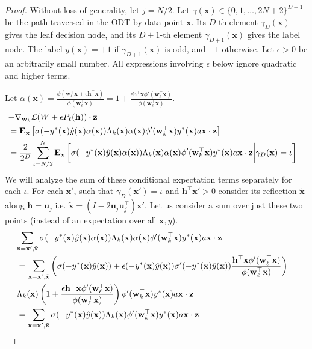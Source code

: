 \documentclass{article}
\theoremstyle{plain}
\theoremstyle{definition}
\theoremstyle{remark}
\newcommand{\E}{{\mathbf E}}
\newcommand{\1}{{\mathbf 1}}
\newcommand{\0}{{\mathbf 0}}
\newcommand{\h}{{\mathbf h}}
\newcommand{\z}{{\mathbf z}}
\newcommand{\w}{{\mathbf w}}
\newcommand{\x}{{\mathbf x}}
\newcommand{\bu}{{\mathbf u}}
\renewcommand{\>}{{\rightarrow}}
\begin{document}
\label{app:second_order_lens}
\begin{proof}
Without loss of generality, let $j=N/2$. Let $\gamma(\x) \in \{0,1,\ldots,2N+2\}^{D+1}$ be the path traversed in the ODT by data point $\x$. Its $D$-th element $\gamma_D(\x)$ gives the leaf decision node, and its $D+1$-th element $\gamma_{D+1}(\x)$ gives the label node. The label $y(\x) =  +1$ if $\gamma_{D+1}(\x)$ is odd, and $-1$ otherwise. Let $\epsilon>0$ be an arbitrarily small number. All expressions involving $\epsilon$ below ignore quadratic and higher terms.

Let $\alpha(\x) = \frac{\phi(\w_{\ell} ^\top \x + \epsilon \h^\top \x)}{\phi(\w_{\ell} ^\top \x)} = 1+\frac{\epsilon \h^\top\x \phi'(\w_\ell^\top \x)}{\phi(\w_\ell^\top \x)}$.
\begin{align}
\lefteqn{-\nabla_{\w_k} \mathcal{L}(W + \epsilon P_\ell(\h)) \cdot \z } \nonumber \\
&= 
\E_{\x} \left[ \sigma (-y^*(\x) \hat y(\x)\alpha(\x)) \Lambda_k(\x) \alpha(\x) \phi'(\w_k^\top \x) y^*(\x)a \x \cdot \z \right] \nonumber  \\
&= \frac{2}{2^D} \sum_{\iota = N/2}^{N}  \E_{\x} \left[ \sigma (-y^*(\x) \hat y(\x)\alpha(\x)) \Lambda_k(\x) \alpha(\x) \phi'(\w_k^\top \x) y^*(\x) a \x \cdot \z  \bigg{|} \gamma_{D}(\x) = \iota \right] \label{eq:second_order_eq1}
\end{align}
We will analyze the sum of these conditional expectation terms separately for each $\iota$. For each $\x'$, such that $\gamma_{D}(\x') = \iota $ and $\h^\top \x' > 0$ consider its reflection $\tilde \x$ along $\h = \bu_j$ i.e. $\tilde\x = (I-2 \bu_j \bu_j^\top)\x'$.  Let us consider a sum over just these two points (instead of an expectation over all $\x,y$).
\begin{align}
\lefteqn{\sum_{\x=\x',\tilde\x} \sigma (-y^*(\x) \hat y(\x)\alpha(\x)) \Lambda_k(\x) \alpha(\x) \phi'(\w_k^\top \x) y^*(\x)a \x \cdot \z } \nonumber  \\
&=
\sum_{\x=\x',\tilde\x} \left(\sigma(-y^*(\x) \hat y(\x))+\epsilon(-y^*(\x) \hat y(\x)) \sigma'(-y^*(\x) \hat y(\x))\frac{\h^\top \x \phi'(\w_\ell^\top \x)}{\phi(\w_\ell^\top \x)} \right) \nonumber \\ 
&\Lambda_k(\x) \left(1+\frac{\epsilon \h^\top\x \phi'(\w_\ell^\top \x)}{\phi(\w_\ell^\top \x)}\right) \phi'(\w_k^\top \x) y^*(\x) a \x \cdot \z \nonumber  \\
&= \sum_{\x=\x',\tilde\x} \sigma(-y^*(\x) \hat y(\x)) \Lambda_k(\x) \phi'(\w_k^\top \x) y^*(\x)a \x \cdot \z ~ +   \nonumber  \\

\end{align}
\end{proof}
\end{document}
